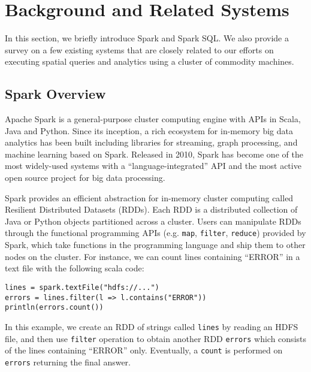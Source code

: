 \section{Background and Related Systems}
\label{sec:background}
In this section, we briefly introduce Spark and Spark SQL. We also
provide a survey on a few existing systems that are closely related to
our efforts on executing spatial queries and analytics using a cluster
of commodity machines.

\subsection{Spark Overview}
\label{sub:spark}
Apache Spark \cite{spark} is a general-purpose cluster computing
engine with APIs in Scala, Java and Python. Since its inception, a
rich ecosystem for in-memory big data analytics has been built
including libraries for streaming, graph processing, and machine
learning \cite{apachespark} based on Spark.  Released in 2010, Spark
has become one of the most widely-used systems with a
``language-integrated'' API and the most active open source project
for big data processing.

Spark provides an efficient abstraction for in-memory cluster
computing called Resilient Distributed Datasets (RDDs). Each RDD is a
distributed collection of Java or Python objects partitioned across a
cluster. Users can manipulate RDDs through the functional programming
APIs (e.g. \texttt{map}, \texttt{filter}, \texttt{reduce}) provided by
Spark, which take functions in the programming language and ship them
to other nodes on the cluster. For instance, we can count lines
containing ``ERROR'' in a text file with the following scala code:

\begin{lstlisting}
lines = spark.textFile("hdfs://...")
errors = lines.filter(l => l.contains("ERROR"))
println(errors.count())
\end{lstlisting}

In this example, we create an RDD of strings called \texttt{lines} by
reading an HDFS file, and then use \texttt{filter} operation to obtain
another RDD \texttt{errors} which consists of the lines containing
``ERROR'' only. Eventually, a \texttt{count} is performed on
\texttt{errors} returning the final answer.

